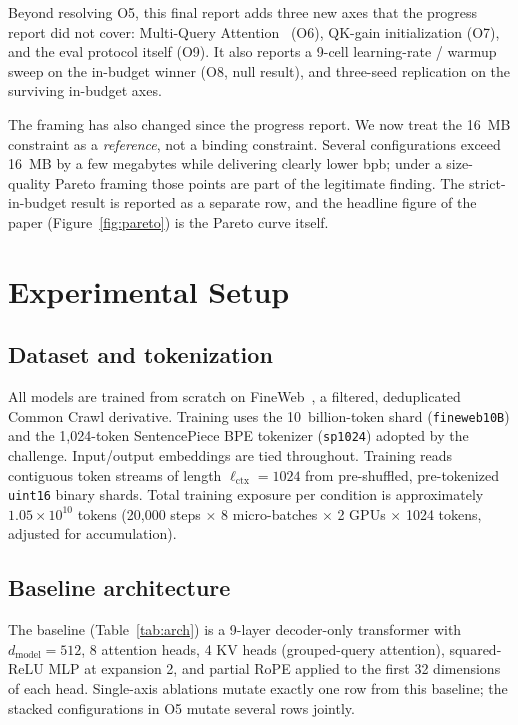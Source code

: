 \documentclass[sigconf,nonacm,natbib=false]{acmart}
\renewcommand{\_}{\discretionary{\char`\_}{}{\char`\_}}
\begin{document}
Beyond resolving O5, this final report adds three new axes that the
progress report did not cover: Multi-Query Attention~\cite{mqa2019}
(O6), QK-gain initialization (O7), and the eval protocol itself
(O9). It also reports a 9-cell learning-rate / warmup sweep on the
in-budget winner (O8, null result), and three-seed replication on the
surviving in-budget axes.

The framing has also changed since the progress report. We now treat
the 16~MB constraint as a \emph{reference}, not a binding constraint.
Several configurations exceed 16~MB by a few megabytes while delivering
clearly lower bpb; under a size-quality Pareto framing those points
are part of the legitimate finding. The strict-in-budget result is
reported as a separate row, and the headline figure of the paper
(Figure~\ref{fig:pareto}) is the Pareto curve itself.

\section{Experimental Setup}

\subsection{Dataset and tokenization}

All models are trained from scratch on FineWeb~\cite{fineweb2024}, a
filtered, deduplicated Common Crawl derivative. Training uses the
10~billion-token shard (\texttt{fineweb10B}) and the 1{,}024-token
SentencePiece BPE tokenizer (\texttt{sp1024}) adopted by the challenge.
Input/output embeddings are tied throughout. Training reads contiguous
token streams of length $\ell_{\text{ctx}}{=}1024$ from pre-shuffled,
pre-tokenized \texttt{uint16} binary shards. Total training exposure
per condition is approximately $1.05 \times 10^{10}$ tokens
(20{,}000 steps $\times$ 8 micro-batches $\times$ 2 GPUs $\times$
1024 tokens, adjusted for accumulation).

\subsection{Baseline architecture}

The baseline (Table~\ref{tab:arch}) is a 9-layer decoder-only
transformer with $d_{\text{model}}{=}512$, 8 attention heads, 4 KV
heads (grouped-query attention), squared-ReLU MLP at expansion 2, and
partial RoPE applied to the first 32 dimensions of each head.
Single-axis ablations mutate exactly one row from this baseline; the
stacked configurations in O5 mutate several rows jointly.
\end{document}
